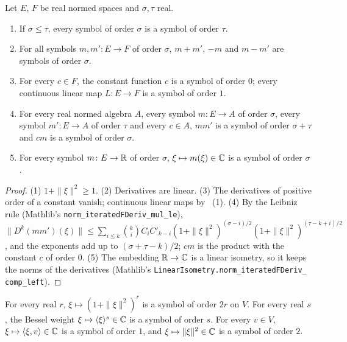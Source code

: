 \begin{lemma}
\label{lem:symbol-algebra}
\leanok
{}
Let $E$, $F$ be real normed spaces and $\sigma, \tau$ real.
\begin{enumerate}
  \item If $\sigma \leq \tau$, every symbol of order $\sigma$ is a symbol of order $\tau$.
  \item For all symbols $m, m' \colon E \to F$ of order $\sigma$, $m + m'$, $-m$ and $m - m'$
    are symbols of order $\sigma$.
  \item For every $c \in F$, the constant function $c$ is a symbol of order $0$; every
    continuous linear map $L \colon E \to F$ is a symbol of order $1$.
  \item For every real normed algebra $A$, every symbol $m \colon E \to A$ of order $\sigma$,
    every symbol $m' \colon E \to A$ of order $\tau$ and every $c \in A$, $m m'$ is a symbol of
    order $\sigma + \tau$ and $c m$ is a symbol of order $\sigma$.
  \item For every symbol $m \colon E \to \mathbb{R}$ of order $\sigma$, $\xi \mapsto m(\xi) \in \mathbb{C}$ is
    a symbol of order $\sigma$.
\end{enumerate}
\end{lemma}

\begin{proof}
\leanok
(1) $1 + \|\xi\|^2 \geq 1$. (2) Derivatives are linear. (3) The derivatives of positive order of
a constant vanish; continuous linear maps by ~(1).
(4) By the Leibniz rule (Mathlib's
\texttt{norm\_\allowbreak iteratedFDeriv\_\allowbreak mul\_\allowbreak le}),
$\|D^k (m m')(\xi)\| \leq \sum_{i \leq k} \binom{k}{i} C_i C'_{k-i}
(1 + \|\xi\|^2)^{(\sigma - i)/2} (1 + \|\xi\|^2)^{(\tau - k + i)/2}$, and the exponents add up to
$(\sigma + \tau - k)/2$; $c m$ is the product with the constant $c$ of order $0$. (5) The
embedding $\mathbb{R} \to \mathbb{C}$ is a linear isometry, so it keeps the norms of the derivatives (Mathlib's
\texttt{LinearIsometry.\allowbreak norm\_\allowbreak iteratedFDeriv\_\allowbreak
comp\_\allowbreak left}).
\end{proof}

\begin{lemma}
\label{lem:symbol-examples}
\leanok
{}
For every real $r$, $\xi \mapsto (1 + \|\xi\|^2)^r$ is a symbol of order $2r$ on $V$. For every
real $s$, the Bessel weight $\xi \mapsto \langle \xi \rangle^s \in \mathbb{C}$ is a symbol of order $s$.
For every $v \in V$, $\xi \mapsto \langle \xi, v \rangle \in \mathbb{C}$ is a symbol of order $1$, and
$\xi \mapsto \|\xi\|^2 \in \mathbb{C}$ is a symbol of order $2$.
\end{lemma}

